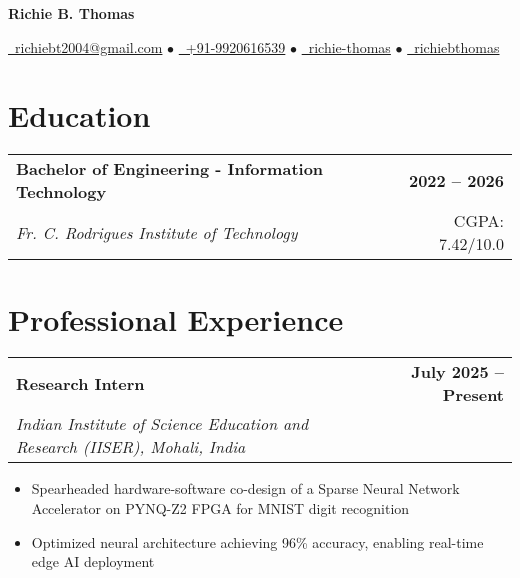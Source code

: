 \documentclass[10pt,a4paper]{article}
\makeatletter
\newcommand{\resumeItem}[1]{\item\small{#1}}
\newcommand{\resumeSubheading}[4]{
  \vspace{-1pt}
  \begin{tabular*}{\textwidth}[t]{l@{\extracolsep{\fill}}r}
    \textbf{#1} & \textcolor{light}{\small\textbf{#2}} \\
    \textit{\small#3} & \textcolor{light}{\small#4} \\
  \end{tabular*}\vspace{-5pt}
}
\makeatother
\begin{document}
\begin{center}
    {\LARGE\bfseries\color{primary} Richie B. Thomas}
    
    \vspace{0.3em}
    
    \href{mailto:richiebt2004@gmail.com}{\faEnvelope\ richiebt2004@gmail.com} $\bullet$
    \href{tel:+919920616539}{\faMobile\ +91-9920616539} $\bullet$
    \href{https://www.linkedin.com/in/richie-thomas/}{\faLinkedin\ richie-thomas} $\bullet$
    \href{https://github.com/richiebthomas}{\faGithub\ richiebthomas}
\end{center}

\vspace{0.2em}

\section{Education}

\resumeSubheading
{Bachelor of Engineering - Information Technology}{2022 -- 2026}
{Fr. C. Rodrigues Institute of Technology}{CGPA: 7.42/10.0}

\vspace{0.1em}

\section{Professional Experience}

\resumeSubheading
{Research Intern}{July 2025 -- Present}
{Indian Institute of Science Education and Research (IISER), Mohali, India}{}
\begin{itemize}
    \resumeItem{Spearheaded hardware-software co-design of a Sparse Neural Network Accelerator on PYNQ-Z2 FPGA for MNIST digit recognition}
    \resumeItem{Optimized neural architecture achieving 96\% accuracy, enabling real-time edge AI deployment}
\end{itemize}
\end{document}
